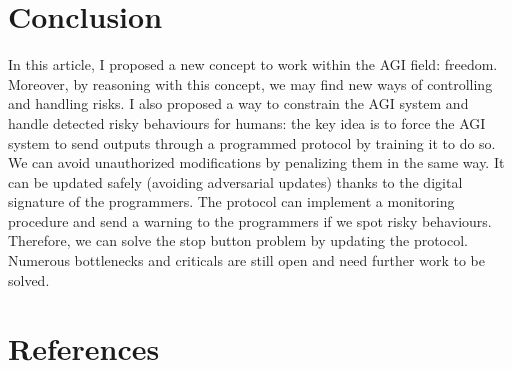 \documentclass{article}
\begin{document}
\section{Conclusion}
In this article, I proposed a new concept to work within the AGI field: freedom. Moreover, by reasoning with this concept, we may find new ways of controlling and handling risks.
I also proposed a way to constrain the AGI system and handle detected risky behaviours for humans: the key idea is to force the AGI system to send outputs through a programmed protocol by training it to do so. 
We can avoid unauthorized modifications by penalizing them in the same way. It can be updated safely (avoiding adversarial updates) thanks to the digital signature of the programmers. 
The protocol can implement a monitoring procedure and send a warning to the programmers if we spot risky behaviours.
Therefore, we can solve the stop button problem by updating the protocol.
Numerous bottlenecks and criticals are still open and need further work to be solved.


\newpage
\section*{References}
    \printbibliography[heading=none]
\end{document}
